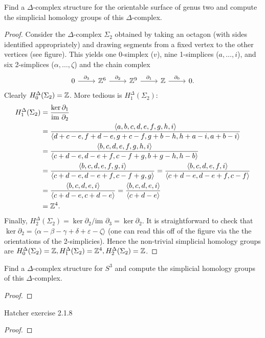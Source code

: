 \documentclass{../../mathnotes}
\begin{document}
\begin{prop}
    Find a $\Delta$-complex structure for the orientable surface of genus two and compute
    the simplicial homology groups of this $\Delta$-complex.
\end{prop}
\begin{proof}
    Consider the $\Delta$-complex $\Sigma_2$ obtained by taking an octagon (with sides identified
    appropriately) and drawing segments from a fixed vertex to the other vertices (see figure). This
    yields one 0-simplex ($v$), nine 1-simplices ($a,\ldots, i$), and six 2-simplices ($\alpha,\ldots,\zeta$)
    and the chain complex
    \begin{equation*}
        \begin{tikzcd}
            0\arrow{r}{\partial_3}&\Z^6\arrow{r}{\partial_2}&\Z^9\arrow{r}{\partial_1}&\Z\arrow{r}{\partial_0}&0.
        \end{tikzcd}
    \end{equation*}
    Clearly $H^\Delta_0(\Sigma_2)=\mathbb{Z}$. More tedious is $H_1^\Delta(\Sigma_2)$:
    \begin{align*}
        H^\Delta_1(\Sigma_2)&=\frac{\ker\partial_1}{\text{im }\partial_2}\\
        &=\frac{\langle a,b,c,d,e,f,g,h,i\rangle}{\langle d+c-e,f+d-e,g+c-f,g+b-h,h+a-i,a+b-i\rangle}\\
        &=\frac{\langle b,c,d,e,f,g,h,i\rangle}{\langle c+d-e,d-e+f,c-f+g,b+g-h,h-b\rangle}\\
        &=\frac{\langle b,c,d,e,f,g,i\rangle}{\langle c+d-e,d-e+f,c-f+g,g\rangle}
        =\frac{\langle b,c,d,e,f,i \rangle}{\langle c+d-e,d-e+f,c-f\rangle}\\
        &=\frac{\langle b,c,d,e,i\rangle}{\langle c+d-e,c+d-e\rangle}=\frac{\langle b,c,d,e,i\rangle}{\langle c+d-e\rangle}\\
        &=\mathbb{Z}^4.
    \end{align*}
    Finally, $H_2^\Delta(\Sigma_2)=\ker\partial_2/\text{im }\partial_3=\ker\partial_2$. It is straightforward to check that
    $\ker\partial_2=\langle\alpha-\beta-\gamma+\delta+\varepsilon-\zeta\rangle$ (one can read this off of the figure via the
    the orientations of the 2-simplicies). Hence the non-trivial simplicial homology groups are $H^\Delta_0(\Sigma_2)=\mathbb{Z},
    H^\Delta_1(\Sigma_2)=\mathbb{Z}^4,H^\Delta_2(\Sigma_2)=\mathbb{Z}$.
\end{proof}


\begin{prop}
    Find a $\Delta$-complex structure for $S^3$ and compute the simplicial homology groups
    of this $\Delta$-complex.
\end{prop}
\begin{proof}
    
\end{proof}


\begin{prop}
    Hatcher exercise 2.1.8
\end{prop}
\begin{proof}
    
\end{proof}
\end{document}
